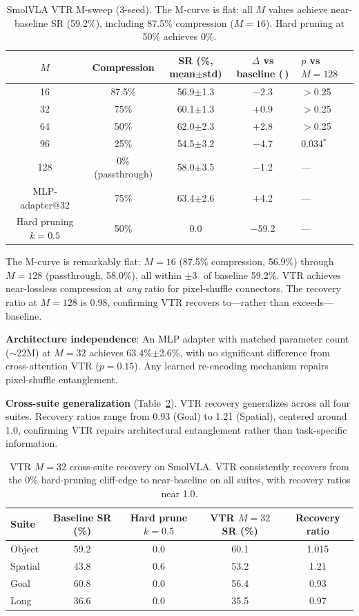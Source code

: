 \documentclass[10pt,letterpaper]{article}
\newcommand{\pp}{\,\text{pp}}
\begin{document}
\begin{table}[t]
\centering
\caption{SmolVLA VTR M-sweep (3-seed). The M-curve is flat: all $M$ values achieve near-baseline SR (59.2\%), including 87.5\% compression ($M\!=\!16$). Hard pruning at 50\% achieves 0\%.}
\label{tab:vtr_msweep}
\small
\begin{tabular}{ccccl}
\toprule
$M$ & Compression & SR (\%, mean$\pm$std) & $\Delta$ vs baseline (\pp) & $p$ vs $M\!=\!128$ \\
\midrule
16 & 87.5\% & 56.9$\pm$1.3 & $-$2.3 & $>$0.25 \\
32 & 75\% & 60.1$\pm$1.3 & $+$0.9 & $>$0.25 \\
64 & 50\% & 62.0$\pm$2.3 & $+$2.8 & $>$0.25 \\
96 & 25\% & 54.5$\pm$3.2 & $-$4.7 & 0.034$^*$ \\
128 & 0\% (passthrough) & 58.0$\pm$3.5 & $-$1.2 & --- \\
\midrule
MLP-adapter@32 & 75\% & 63.4$\pm$2.6 & $+$4.2 & --- \\
Hard pruning $k\!=\!0.5$ & 50\% & 0.0 & $-$59.2 & --- \\
\bottomrule
\end{tabular}
\end{table}

The M-curve is remarkably flat: $M\!=\!16$ (87.5\% compression, 56.9\%) through $M\!=\!128$ (passthrough, 58.0\%), all within $\pm$3\pp\ of baseline 59.2\%. VTR achieves near-lossless compression at \emph{any} ratio for pixel-shuffle connectors. The recovery ratio at $M\!=\!128$ is 0.98, confirming VTR recovers to---rather than exceeds---baseline.

\textbf{Architecture independence}: An MLP adapter with matched parameter count ($\sim$22M) at $M\!=\!32$ achieves 63.4\%$\pm$2.6\%, with no significant difference from cross-attention VTR ($p\!=\!0.15$). Any learned re-encoding mechanism repairs pixel-shuffle entanglement.

\textbf{Cross-suite generalization} (Table~\ref{tab:vtr_crosssuite}). VTR recovery generalizes across all four suites. Recovery ratios range from 0.93 (Goal) to 1.21 (Spatial), centered around 1.0, confirming VTR repairs architectural entanglement rather than task-specific information.

\begin{table}[t]
\centering
\caption{VTR $M\!=\!32$ cross-suite recovery on SmolVLA. VTR consistently recovers from the 0\% hard-pruning cliff-edge to near-baseline on all suites, with recovery ratios near 1.0.}
\label{tab:vtr_crosssuite}
\small
\begin{tabular}{lcccc}
\toprule
Suite & Baseline SR (\%) & Hard prune $k\!=\!0.5$ & VTR $M\!=\!32$ SR (\%) & Recovery ratio \\
\midrule
Object & 59.2 & 0.0 & 60.1 & 1.015 \\
Spatial & 43.8 & 0.6 & 53.2 & 1.21 \\
Goal & 60.8 & 0.0 & 56.4 & 0.93 \\
Long & 36.6 & 0.0 & 35.5 & 0.97 \\
\bottomrule
\end{tabular}
\end{table}
\end{document}
